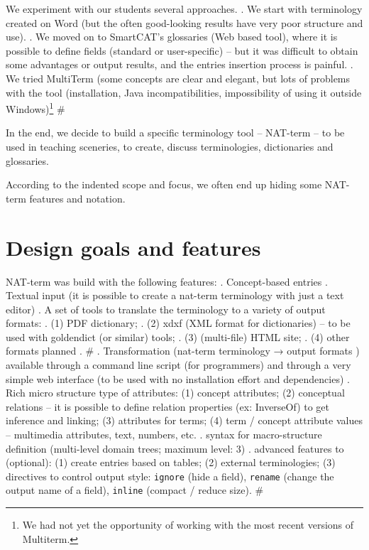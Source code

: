 \documentclass{ceurart}
\begin{document}
We experiment with our students several approaches.
\:
  . We start with terminology created on Word (but the
  often good-looking results have very poor structure and use).
  . We moved on to SmartCAT's glossaries\cite{smartcatgloss} (Web based tool),
   where it is possible to define fields (standard or user-specific) -- but it was
  difficult to obtain some advantages or output results, and the entries insertion process is painful.
  . We tried MultiTerm\cite{multiterm} (some concepts are clear and elegant, but lots of problems
    with the tool (installation, Java incompatibilities, impossibility of using
it outside Windows)\footnote{We had not yet the opportunity of working with the most recent
       versions of Multiterm.}
  #


In the end, we decide to build a specific terminology tool -- NAT-term -- 
to be used in teaching sceneries, to create, discuss terminologies, dictionaries and glossaries.


According to the indented scope and focus, we often end up hiding some NAT-term features and notation.

\section{Design goals and features}

NAT-term was build with the following features:
. Concept-based entries
. Textual input (it is possible to create a nat-term terminology with just a text editor)
. A set of tools to translate the terminology to a variety of output formats:
  . (1) PDF dictionary;
  . (2) xdxf \cite{xdxf} (XML format for dictionaries) -- to be used with 
       goldendict\cite{goldendict} (or similar) tools;
  . (3) (multi-file) HTML site;
  . (4) other formats planned \cite{tbx}.
  #
. Transformation (nat-term terminology → output formats ) available through a command line
   script (for programmers) and through a very simple web interface (to be used with
   no installation effort and dependencies)
. Rich micro structure type of attributes:
   (1) concept attributes;
   (2) conceptual relations -- it is possible to define relation properties (ex: InverseOf) 
        to get inference and linking;
   (3) attributes for terms;
   (4) term / concept attribute values -- multimedia attributes, text, numbers, etc.
. syntax for macro-structure definition (multi-level domain trees; maximum level: 3)
. advanced features to (optional):
    (1) create entries based on tables;
    (2) external terminologies;
    (3) directives to control output style: \texttt{ignore} (hide a field),
        \texttt{rename} (change the output name of a field),
        \texttt{inline} (compact / reduce size).
#
\end{document}
